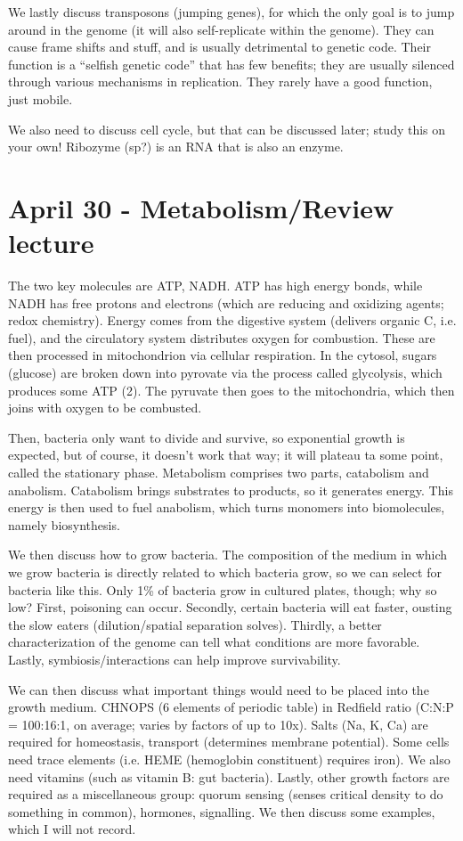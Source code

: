 \documentclass[12pt]{article}
\begin{document}
We lastly discuss transposons (jumping genes), for which the only goal is to jump around in the genome (it will also self-replicate within the genome). They can cause frame shifts and stuff, and is usually detrimental to genetic code. Their function is a ``selfish genetic code'' that has few benefits; they are usually silenced through various mechanisms in replication. They rarely have a good function, just mobile. 

We also need to discuss cell cycle, but that can be discussed later; study this on your own! Ribozyme (sp?) is an RNA that is also an enzyme.

\section*{April 30 - Metabolism/Review lecture}

The two key molecules are ATP, NADH. ATP has high energy bonds, while NADH has free protons and electrons (which are reducing and oxidizing agents; redox chemistry). Energy comes from the digestive system (delivers organic C, i.e. fuel), and the circulatory system distributes oxygen for combustion. These are then processed in mitochondrion via cellular respiration. In the cytosol, sugars (glucose) are broken down into pyrovate via the process called glycolysis, which produces some ATP (2). The pyruvate then goes to the mitochondria, which then joins with oxygen to be combusted. 

Then, bacteria only want to divide and survive, so exponential growth is expected, but of course, it doesn't work that way; it will plateau ta some point, called the stationary phase. Metabolism comprises two parts, catabolism and anabolism. Catabolism brings substrates to products, so it generates energy. This energy is then used to fuel anabolism, which turns monomers into biomolecules, namely biosynthesis.

We then discuss how to grow bacteria. The composition of the medium in which we grow bacteria is directly related to which bacteria grow, so we can select for bacteria like this. Only 1\% of bacteria grow in cultured plates, though; why so low? First, poisoning can occur. Secondly, certain bacteria will eat faster, ousting the slow eaters (dilution/spatial separation solves). Thirdly, a better characterization of the genome can tell what conditions are more favorable. Lastly, symbiosis/interactions can help improve survivability.

We can then discuss what important things would need to be placed into the growth medium. CHNOPS (6 elements of periodic table) in Redfield ratio (C:N:P = 100:16:1, on average; varies by factors of up to 10x). Salts (Na, K, Ca) are required for homeostasis, transport (determines membrane potential). Some cells need trace elements (i.e. HEME (hemoglobin constituent) requires iron). We also need vitamins (such as vitamin B: gut bacteria). Lastly, other growth factors are required as a miscellaneous group: quorum sensing (senses critical density to do something in common), hormones, signalling. We then discuss some examples, which I will not record. 
\end{document}
